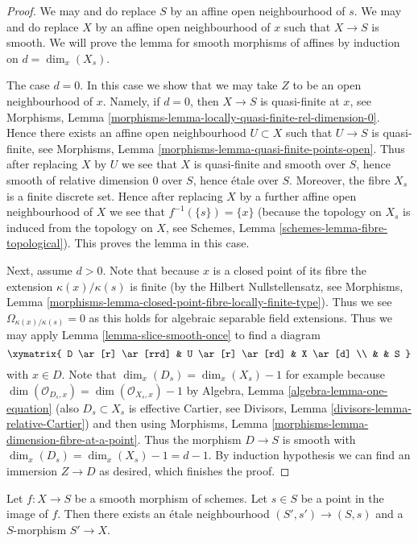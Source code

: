 \begin{proof}
We may and do replace $S$ by an affine open neighbourhood of $s$.
We may and do replace $X$ by an affine open neighbourhood of $x$
such that $X \to S$ is smooth.
We will prove the lemma for smooth morphisms of affines
by induction on $d = \dim_x(X_s)$.

\medskip\noindent
The case $d = 0$. In this case we show that we may take $Z$ to be
an open neighbourhood of $x$. Namely, if $d = 0$, then $X \to S$
is quasi-finite at $x$, see
Morphisms, Lemma \ref{morphisms-lemma-locally-quasi-finite-rel-dimension-0}.
Hence there exists an affine open neighbourhood $U \subset X$ such
that $U \to S$ is quasi-finite, see
Morphisms, Lemma \ref{morphisms-lemma-quasi-finite-points-open}.
Thus after replacing $X$ by $U$ we see that
$X$ is quasi-finite and smooth over $S$, hence
smooth of relative dimension $0$ over $S$, hence
\'etale over $S$. Moreover, the fibre $X_s$ is a finite
discrete set. Hence after replacing $X$ by a further affine open neighbourhood
of $X$ we see that $f^{-1}(\{s\}) = \{x\}$ (because the topology
on $X_s$ is induced from the topology on $X$, see
Schemes, Lemma \ref{schemes-lemma-fibre-topological}).
This proves the lemma in this case.

\medskip\noindent
Next, assume $d > 0$. Note that because $x$ is a closed point of its
fibre the extension $\kappa(x)/\kappa(s)$ is finite (by the
Hilbert Nullstellensatz, see
Morphisms, Lemma \ref{morphisms-lemma-closed-point-fibre-locally-finite-type}).
Thus we see $\Omega_{\kappa(x)/\kappa(s)} = 0$ as this holds for
algebraic separable field extensions.
Thus we may apply
Lemma \ref{lemma-slice-smooth-once}
to find a diagram
$$
\xymatrix{
D \ar[r] \ar[rrd] & U \ar[r] \ar[rd] & X \ar[d] \\
& & S
}
$$
with $x \in D$. Note that
$\dim_x(D_s) = \dim_x(X_s) - 1$ for example because
$\dim(\mathcal{O}_{D_s, x}) = \dim(\mathcal{O}_{X_s, x}) - 1$ by
Algebra, Lemma \ref{algebra-lemma-one-equation}
(also $D_s \subset X_s$ is effective Cartier, see
Divisors, Lemma \ref{divisors-lemma-relative-Cartier})
and then using
Morphisms, Lemma \ref{morphisms-lemma-dimension-fibre-at-a-point}.
Thus the morphism $D \to S$ is smooth with
$\dim_x(D_s) = \dim_x(X_s) - 1 = d - 1$. By induction hypothesis
we can find an immersion $Z \to D$ as desired, which finishes the proof.
\end{proof}

\begin{lemma}
\label{lemma-etale-nbhd-dominates-smooth}
Let $f : X \to S$ be a smooth morphism of schemes.
Let $s \in S$ be a point in the image of $f$.
Then there exists an \'etale neighbourhood $(S', s') \to (S, s)$
and a $S$-morphism $S' \to X$.
\end{lemma}

